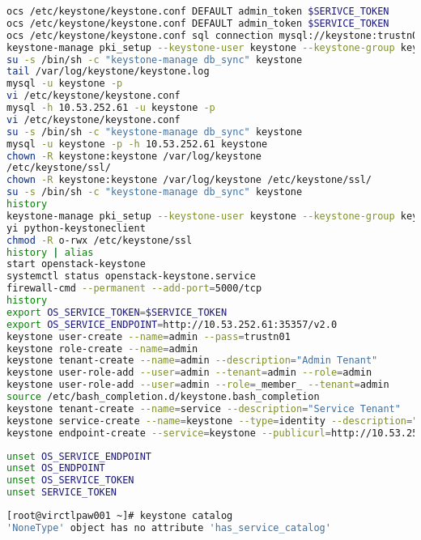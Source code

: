 \documentclass[11pt,letterpaper,oneside]{book}
\begin{document}
\begin{lstlisting}[caption={foo},language=bash]
ocs /etc/keystone/keystone.conf DEFAULT admin_token $SERIVCE_TOKEN
ocs /etc/keystone/keystone.conf DEFAULT admin_token $SERVICE_TOKEN
ocs /etc/keystone/keystone.conf sql connection mysql://keystone:trustn01@10.53.252.61/keystone
keystone-manage pki_setup --keystone-user keystone --keystone-group keystone 
su -s /bin/sh -c "keystone-manage db_sync" keystone
tail /var/log/keystone/keystone.log 
mysql -u keystone -p
vi /etc/keystone/keystone.conf 
mysql -h 10.53.252.61 -u keystone -p
vi /etc/keystone/keystone.conf 
su -s /bin/sh -c "keystone-manage db_sync" keystone
mysql -u keystone -p -h 10.53.252.61 keystone
chown -R keystone:keystone /var/log/keystone 
/etc/keystone/ssl/
chown -R keystone:keystone /var/log/keystone /etc/keystone/ssl/
su -s /bin/sh -c "keystone-manage db_sync" keystone
history
keystone-manage pki_setup --keystone-user keystone --keystone-group keystone 
yi python-keystoneclient
chmod -R o-rwx /etc/keystone/ssl
history | alias
start openstack-keystone
systemctl status openstack-keystone.service 
firewall-cmd --permanent --add-port=5000/tcp
history
export OS_SERVICE_TOKEN=$SERVICE_TOKEN
export OS_SERVICE_ENDPOINT=http://10.53.252.61:35357/v2.0
keystone user-create --name=admin --pass=trustn01
keystone role-create --name=admin
keystone tenant-create --name=admin --description="Admin Tenant"
keystone user-role-add --user=admin --tenant=admin --role=admin
keystone user-role-add --user=admin --role=_member_ --tenant=admin
source /etc/bash_completion.d/keystone.bash_completion 
keystone tenant-create --name=service --description="Service Tenant"
keystone service-create --name=keystone --type=identity --description="OpenStack Identity"
keystone endpoint-create --service=keystone --publicurl=http://10.53.252.61:5000/v2.0 --internalurl=http://10.53.252.61:5000/v2.0 --adminurl=http://10.53.252.61:35357/v2.0
\end{lstlisting}



\begin{lstlisting}[caption={\danger Unset environment variables},language=bash]
unset OS_SERVICE_ENDPOINT
unset OS_ENDPOINT
unset OS_SERVICE_TOKEN
unset SERVICE_TOKEN
\end{lstlisting}


\begin{lstlisting}[caption={\danger Error msg if environment variables are not unset},language=bash]
[root@virctlpaw001 ~]# keystone catalog 
'NoneType' object has no attribute 'has_service_catalog'
\end{lstlisting}
\end{document}
